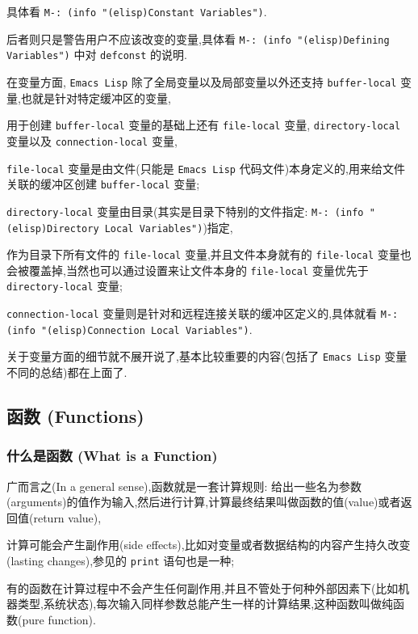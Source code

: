 \documentclass[11pt]{article}
\begin{document}
具体看 \texttt{M-: (info "(elisp)Constant Variables")}.

后者则只是警告用户不应该改变的变量,具体看 \texttt{M-: (info "(elisp)Defining Variables")} 中对 \texttt{defconst} 的说明.

在变量方面, \texttt{Emacs Lisp} 除了全局变量以及局部变量以外还支持 \texttt{buffer-local} 变量,也就是针对特定缓冲区的变量,

用于创建 \texttt{buffer-local} 变量的基础上还有 \texttt{file-local} 变量, \texttt{directory-local} 变量以及 \texttt{connection-local} 变量,

\texttt{file-local} 变量是由文件(只能是 \texttt{Emacs Lisp} 代码文件)本身定义的,用来给文件关联的缓冲区创建 \texttt{buffer-local} 变量;

\texttt{directory-local} 变量由目录(其实是目录下特别的文件指定: \texttt{M-: (info "(elisp)Directory Local Variables")})指定,

作为目录下所有文件的 \texttt{file-local} 变量,并且文件本身就有的 \texttt{file-local} 变量也会被覆盖掉,当然也可以通过设置来让文件本身的 \texttt{file-local} 变量优先于 \texttt{directory-local} 变量;

\texttt{connection-local} 变量则是针对和远程连接关联的缓冲区定义的,具体就看 \texttt{M-: (info "(elisp)Connection Local Variables")}.

关于变量方面的细节就不展开说了,基本比较重要的内容(包括了 \texttt{Emacs Lisp} 变量不同的总结)都在上面了.


\subsection{函数 (Functions)}
\label{sec:org2f940bd}

\subsubsection{什么是函数 (What is a Function)}
\label{sec:orgbed91bd}

广而言之(In a general sense),函数就是一套计算规则: 给出一些名为参数(arguments)的值作为输入,然后进行计算,计算最终结果叫做函数的值(value)或者返回值(return value),

计算可能会产生副作用(side effects),比如对变量或者数据结构的内容产生持久改变(lasting changes),参见的 \texttt{print} 语句也是一种;

有的函数在计算过程中不会产生任何副作用,并且不管处于何种外部因素下(比如机器类型,系统状态),每次输入同样参数总能产生一样的计算结果,这种函数叫做纯函数(pure function).
\end{document}
